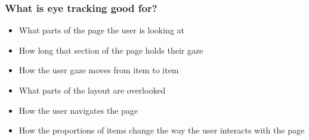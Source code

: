 \begin{frame}
	\frametitle{What is eye tracking good for?}
	\begin{itemize}
		\item What parts of the page the user is looking at
		\item How long that section of the page holds their gaze
		\item How the user gaze moves from item to item
		\item	What parts of the layout are overlooked
		\item How the user navigates the page
		\item How the proportions of items change the way the user interacts with the page
	\end{itemize}
\end{frame}





